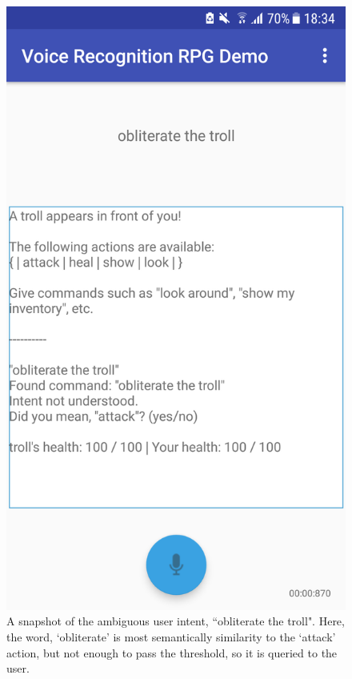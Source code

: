 \documentclass[11pt]{article}
\begin{document}
\begin{center}
\begin{figure}
\begin{center}
  \includegraphics[scale=0.25]{Screenshot_20180522-183411.png}
  \caption{A snapshot of the ambiguous user intent, ``obliterate the troll". Here, the word, `obliterate' is most semantically similarity to the `attack' action, but not enough to pass the threshold, so it is queried to the user.}
  \label{fig:snapshot-suggestion}
  \end{center}
\end{figure}
\end{center}
\end{document}
